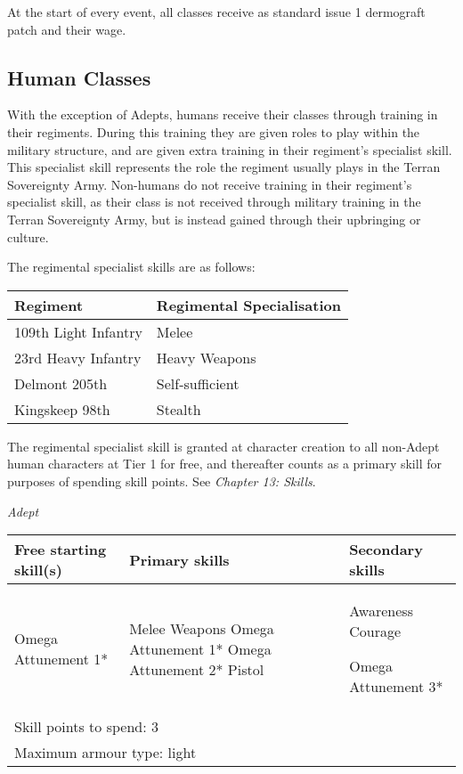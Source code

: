 \documentclass{scrbook}
\begin{document}
At the start of every event, all classes receive as standard issue 1 dermograft patch and their wage.

\subsection{Human Classes}

With the exception of Adepts, humans receive their classes through training in their regiments. During this training they are given roles to play within the military structure, and are given extra training in their regiment's specialist skill. This specialist skill represents the role the regiment usually plays in the Terran Sovereignty Army. Non-humans do not receive training in their regiment's specialist skill, as their class is not received through military training in the Terran Sovereignty Army, but is instead gained through their upbringing or culture.

The regimental specialist skills are as follows:

\begin{table}
\begin{tabular}{|l|l|} \hline 
Regiment & Regimental Specialisation \\
 \hline 109th Light Infantry & Melee \\
 \hline 23rd Heavy Infantry & Heavy Weapons \\
 \hline Delmont 205th & Self-sufficient \\
 \hline Kingskeep 98th & Stealth \\
 \hline \end{tabular}

\end{table}

The regimental specialist skill is granted at character creation to all non-Adept human characters at Tier 1 for free, and thereafter counts as a primary skill for purposes of spending skill points. See \textit{Chapter 13: Skills}.

\textit{Adept}

\begin{table}
\begin{tabular}{|l|l|l|} \hline 
Free starting skill(s) & Primary skills & Secondary skills \\
 \hline Omega Attunement 1* & Melee Weapons Omega Attunement 1* Omega Attunement 2* Pistol & Awareness Courage\par Omega Attunement 3* \\
 \hline \multicolumn{3}{|l|}{Skill points to spend: 3} \\
 \hline \multicolumn{3}{|l|}{Maximum armour type: light} \\
 \hline \end{tabular}

\end{table}
\end{document}
